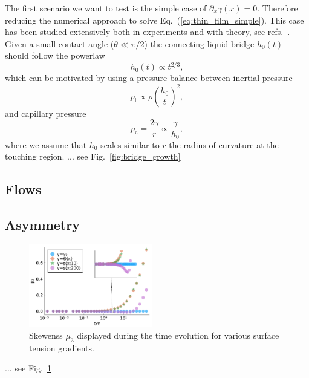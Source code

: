 \documentclass[twocolumn,amsmath,amssymb,showpacs,pre,nofootinbib,superscriptaddress]{revtex4-1} %
\begin{document}
The first scenario we want to test is the simple case of $\partial_x\gamma(x) = 0$.
Therefore reducing the numerical approach to solve Eq.~(\ref{eq:thin_film_simple}).
This case has been studied extensively both in experiments and with theory, see refs.~\cite{eggers_lister_stone_1999, PhysRevLett.95.164503, PhysRevLett.111.144502, duchemin_eggers_josserand_2003}. 
Given a small contact angle ($\theta \ll \pi/2$) the connecting liquid bridge $h_0(t)$ should follow the powerlaw 
\begin{equation}\label{eq:bridge_power23}
    h_0(t) \propto t^{2/3},
\end{equation}
which can be motivated by using a pressure balance between inertial pressure
\begin{equation}\label{eq:p_inert}
    p_{\text{i}} \propto \rho\left(\frac{h_0}{t}\right)^2,
\end{equation}
and capillary pressure~\cite{doi:10.1021/la800630w}
\begin{equation}\label{eq:p_cap}
    p_{\text{c}} = \frac{2\gamma}{r} \propto \frac{\gamma}{h_0},
\end{equation}
where we assume that $h_0$ scales similar to $r$ the radius of curvature at the touching region.
... see Fig.~\ref{fig:bridge_growth}


\subsection{Flows}\label{subsec:flows}

\subsection{Asymmetry}\label{subsec:skewness}
\begin{figure}
    \centering
    \includegraphics[width=0.48\textwidth]{Figures/skew_evo.pdf}
    \caption{Skewenss $\mu_3$ displayed during the time evolution for various surface tension gradients.}
    \label{fig:skewness}
\end{figure}

... see Fig.~\ref{fig:skewness}
\end{document}
